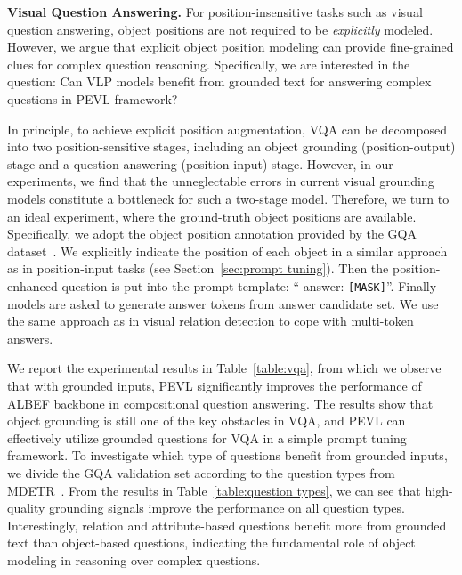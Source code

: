 \documentclass[11pt]{article}
\begin{document}
\smallskip
\textbf{Visual Question Answering.}
For position-insensitive tasks such as visual question answering, object positions are not required to be \textit{explicitly} modeled. However, we argue that explicit object position modeling can provide fine-grained clues for complex question reasoning. Specifically, we are interested in the question: Can VLP models benefit from grounded text for answering complex questions in PEVL framework?


In principle, to achieve explicit position augmentation, VQA can be decomposed into two position-sensitive stages, including an object grounding (position-output) stage and a question answering (position-input) stage. However, in our experiments, we find that the unneglectable errors in current visual grounding models constitute a bottleneck for such a two-stage model. Therefore, we turn to an ideal experiment, where the ground-truth object positions are available. Specifically, we adopt the object position annotation provided by the GQA dataset~\cite{hudson2019gqa}. We explicitly indicate the position of each object in a similar approach as in position-input tasks (see Section~\ref{sec:prompt tuning}). Then the position-enhanced question is put into the prompt template: ``\hspace{0.2mm} answer: \texttt{[MASK]}''. Finally models are asked to generate answer tokens from answer candidate set. We use the same approach as in visual relation detection to cope with multi-token answers. 








We report the experimental results in Table~\ref{table:vqa}, from which we observe that with grounded inputs, PEVL significantly improves the performance of ALBEF backbone in compositional question answering. The results show that object grounding is still one of the key obstacles in VQA, and PEVL can effectively utilize grounded questions for VQA in a simple prompt tuning framework. To investigate which type of questions benefit from grounded inputs, we divide the GQA validation set according to the question types from MDETR~\cite{kamath2021mdetr}. From the results in Table~\ref{table:question types}, we can see that high-quality grounding signals improve the performance on all question types. Interestingly, relation and attribute-based questions benefit more from grounded text than object-based questions, indicating the fundamental role of object modeling in reasoning over complex questions.
\end{document}
